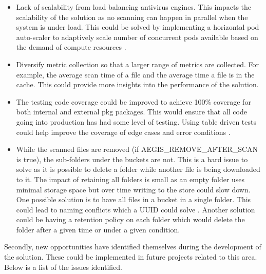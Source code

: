 \documentclass[12pt, conference, final, a4paper, onecolumn, compsoc]{IEEEtran}
\begin{document}
\begin{itemize}
  \item Lack of scalability from load balancing antivirus engines. This impacts
        the scalability of the solution as no scanning can happen in parallel
        when the system is under load. This could be solved by implementing a
        horizontal pod auto-scaler to adaptively scale number of concurrent pods
        available based on the demand of compute resources \citep{scale-pods}.
  \item Diversify metric collection so that a larger range of metrics are
        collected. For example, the average scan time of a file and the average
        time a file is in the cache. This could provide more insights into the
        performance of the solution.
  \item The testing code coverage could be improved to achieve 100\% coverage
        for both internal and external pkg packages. This would ensure that all
        code going into production has had some level of testing. Using table
        driven tests could help improve the coverage of edge cases and error
        conditions \citep{table-driven-tests}.
  \item While the scanned files are removed (if AEGIS\_REMOVE\_AFTER\_SCAN is
        true), the sub-folders under the buckets are not. This is a hard issue
        to solve as it is possible to delete a folder while another file is
        being downloaded to it. The impact of retaining all folders is small as
        an empty folder uses minimal storage space but over time writing to the
        store could slow down. One possible solution is to have all files in a
        bucket in a single folder. This could lead to naming conflicts which a
        UUID could solve \citep{UUID}. Another solution could be having a
        retention policy on each folder which would delete the folder after a
        given time or under a given condition.
\end{itemize}

Secondly, new opportunities have identified themselves during the development of
the solution. These could be implemented in future projects related to this
area. Below is a list of the issues identified.
\end{document}
